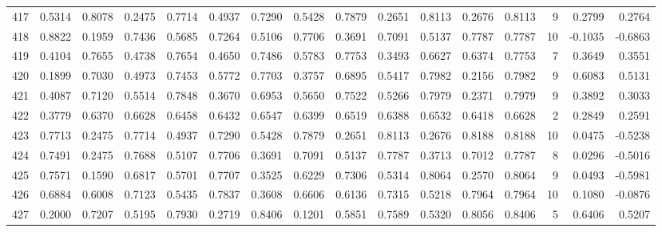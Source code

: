 \begin{tabular}{lrrrrrrrrrrrrrrr}
417 &      0.5314 &  0.8078 &  0.2475 &  0.7714 &  0.4937 &  0.7290 &  0.5428 &  0.7879 &  0.2651 &  0.8113 &   0.2676 &     0.8113 &      9 &                    0.2799 &                     0.2764 \\
418 &      0.8822 &  0.1959 &  0.7436 &  0.5685 &  0.7264 &  0.5106 &  0.7706 &  0.3691 &  0.7091 &  0.5137 &   0.7787 &     0.7787 &     10 &                   -0.1035 &                    -0.6863 \\
419 &      0.4104 &  0.7655 &  0.4738 &  0.7654 &  0.4650 &  0.7486 &  0.5783 &  0.7753 &  0.3493 &  0.6627 &   0.6374 &     0.7753 &      7 &                    0.3649 &                     0.3551 \\
420 &      0.1899 &  0.7030 &  0.4973 &  0.7453 &  0.5772 &  0.7703 &  0.3757 &  0.6895 &  0.5417 &  0.7982 &   0.2156 &     0.7982 &      9 &                    0.6083 &                     0.5131 \\
421 &      0.4087 &  0.7120 &  0.5514 &  0.7848 &  0.3670 &  0.6953 &  0.5650 &  0.7522 &  0.5266 &  0.7979 &   0.2371 &     0.7979 &      9 &                    0.3892 &                     0.3033 \\
422 &      0.3779 &  0.6370 &  0.6628 &  0.6458 &  0.6432 &  0.6547 &  0.6399 &  0.6519 &  0.6388 &  0.6532 &   0.6418 &     0.6628 &      2 &                    0.2849 &                     0.2591 \\
423 &      0.7713 &  0.2475 &  0.7714 &  0.4937 &  0.7290 &  0.5428 &  0.7879 &  0.2651 &  0.8113 &  0.2676 &   0.8188 &     0.8188 &     10 &                    0.0475 &                    -0.5238 \\
424 &      0.7491 &  0.2475 &  0.7688 &  0.5107 &  0.7706 &  0.3691 &  0.7091 &  0.5137 &  0.7787 &  0.3713 &   0.7012 &     0.7787 &      8 &                    0.0296 &                    -0.5016 \\
425 &      0.7571 &  0.1590 &  0.6817 &  0.5701 &  0.7707 &  0.3525 &  0.6229 &  0.7306 &  0.5314 &  0.8064 &   0.2570 &     0.8064 &      9 &                    0.0493 &                    -0.5981 \\
426 &      0.6884 &  0.6008 &  0.7123 &  0.5435 &  0.7837 &  0.3608 &  0.6606 &  0.6136 &  0.7315 &  0.5218 &   0.7964 &     0.7964 &     10 &                    0.1080 &                    -0.0876 \\
427 &      0.2000 &  0.7207 &  0.5195 &  0.7930 &  0.2719 &  0.8406 &  0.1201 &  0.5851 &  0.7589 &  0.5320 &   0.8056 &     0.8406 &      5 &                    0.6406 &                     0.5207 \\

\end{tabular}
